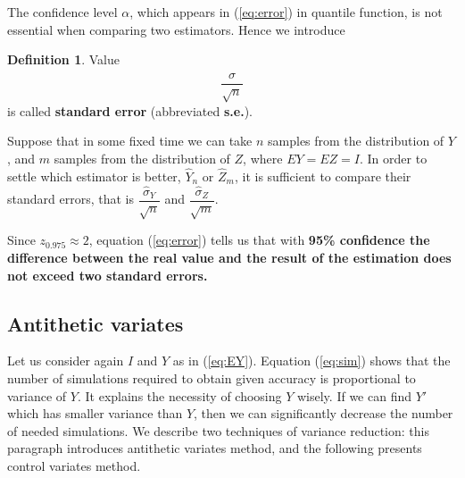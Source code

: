 \documentclass[a4paper,11pt, twoside]{book}
\theoremstyle{definition}
\newtheorem{mydef}{Definition}[chapter]
\theoremstyle{remark}
\begin{document}
The confidence level $\alpha$, which appears in (\ref{eq:error}) in quantile function, is not essential when comparing two estimators. Hence we introduce 
\begin{mydef}
 Value
 \begin{equation}
  \label{eq:stderr}
  \frac{\hat{\sigma}}{\sqrt{n}}
 \end{equation}
is called \textbf{standard error} (abbreviated \textbf{s.e.}).
\end{mydef}
Suppose that in some fixed time we can take $n$ samples from the distribution of $Y$, and $m$ samples from the distribution of $Z$, where $EY = EZ = I$. In order to settle which estimator is better, $\hat{Y}_n$ or $\hat{Z}_m$, it is sufficient to compare their standard errors, that is $\dfrac{\hat{\sigma}_Y}{\sqrt{n}}$ and $\dfrac{\hat{\sigma}_Z}{\sqrt{m}}$.

Since $z_{0.975} \approx 2$, equation (\ref{eq:error}) tells us that with \textbf{95\% confidence the difference between the real value and the result of the estimation does not exceed two standard errors.}

\subsection{Antithetic variates}
Let us consider again $I$ and $Y$ as in (\ref{eq:EY}). Equation (\ref{eq:sim}) shows that the number of simulations required to obtain given accuracy is proportional to variance of $Y$. It explains the necessity of choosing $Y$ wisely. If we can find $Y'$ which has smaller variance than $Y$, then we can significantly decrease the number of needed simulations.
We describe two techniques of variance reduction: this paragraph introduces antithetic variates method, and the following presents control variates method.
\end{document}
